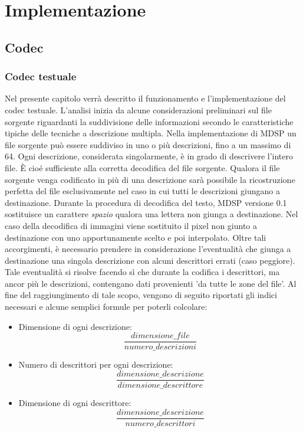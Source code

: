 \chapter{Implementazione}
\section{Codec}
\subsection{Codec testuale}
\label{cap:implementazione_codec}
Nel presente capitolo verrà descritto il funzionamento e l'implementazione
del codec testuale. L'analisi inizia da alcune considerazioni preliminari sul
file sorgente riguardanti la suddivisione delle informazioni secondo le
caratteristiche tipiche delle tecniche a descrizione multipla. Nella
implementazione di MDSP un file sorgente può essere suddiviso in uno o più
descrizioni, fino a un massimo di 64. Ogni descrizione, considerata
singolarmente, è in grado di descrivere l'intero file. \`E cioé sufficiente
alla corretta decodifica del file sorgente. Qualora il file sorgente venga
codificato in più di una descrizione sarà possibile la ricostruzione
perfetta del file esclusivamente nel caso in cui tutti le descrizioni giungano
a destinazione. Durante la procedura di decodifica del testo, MDSP versione 0.1
sostituisce un carattere \emph{spazio} qualora una lettera non giunga a
destinazione. Nel caso della decodifica di immagini viene sostituito il
pixel non giunto a destinazione con uno apportunamente scelto e
poi interpolato. Oltre tali accorgimenti, è necessario prendere in
considerazione l'eventualità che giunga a destinazione una singola descrizione
con alcuni descrittori errati (caso peggiore). Tale eventualità si risolve
facendo sì che durante la codifica i descrittori, ma ancor più le descrizioni,
contengano dati provenienti 'da tutte le zone del file'. Al fine del
raggiungimento di tale scopo, vengono di seguito riportati gli indici necessari
e alcune semplici formule per poterli colcolare:
\begin{itemize}
 \item Dimensione di ogni descrizione: $$\frac{dimensione\_file}{numero\_descrizioni}$$
 \item Numero di descrittori per ogni descrizione: $$\frac{dimensione\_descrizione}{dimensione\_descrittore}$$
 \item Dimensione di ogni descrittore: $$\frac{dimensione\_descrizione}{numero\_descrittori}$$
\end{itemize}
